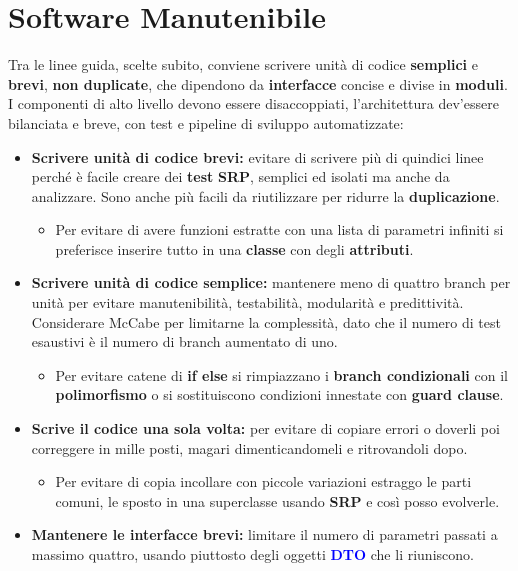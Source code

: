 \section{Software Manutenibile}
Tra le linee guida, scelte subito, conviene scrivere unità di codice \textbf{semplici} e \textbf{brevi}, \textbf{non duplicate}, che dipendono da \textbf{interfacce} concise e divise in \textbf{moduli}. I componenti di alto livello devono essere disaccoppiati, l'architettura dev'essere bilanciata e breve, con test e pipeline di sviluppo automatizzate:
\begin{itemize}
    \item \textbf{Scrivere unità di codice brevi:} evitare di scrivere più di quindici linee perché è facile creare dei \textbf{test} \textbf{SRP}, semplici ed isolati ma anche da analizzare. Sono anche più facili da riutilizzare per ridurre la \textbf{duplicazione}.
    \begin{itemize}
        \item Per evitare di avere funzioni estratte con una lista di parametri infiniti si preferisce inserire tutto in una \textbf{classe} con degli \textbf{attributi}.
    \end{itemize}
    \item \textbf{Scrivere unità di codice semplice:} mantenere meno di quattro branch per unità per evitare manutenibilità, testabilità, modularità e predittività. Considerare McCabe per limitarne la complessità, dato che il numero di test esaustivi è il numero di branch aumentato di uno.
    \begin{itemize}
        \item Per evitare catene di \textbf{if else} si rimpiazzano i \textbf{branch condizionali} con il \textbf{polimorfismo} o si sostituiscono condizioni innestate con \textbf{guard clause}.
    \end{itemize}
    \item \textbf{Scrive il codice una sola volta:} per evitare di copiare errori o doverli poi correggere in mille posti, magari dimenticandomeli e ritrovandoli dopo.
    \begin{itemize}
        \item Per evitare di copia incollare con piccole variazioni estraggo le parti comuni, le sposto in una superclasse usando \textbf{SRP} e così posso evolverle.
    \end{itemize}
    \item \textbf{Mantenere le interfacce brevi:} limitare il numero di parametri passati a massimo quattro, usando piuttosto degli oggetti \textbf{\textcolor{blue}{DTO}} che li riuniscono.

\end{itemize}
